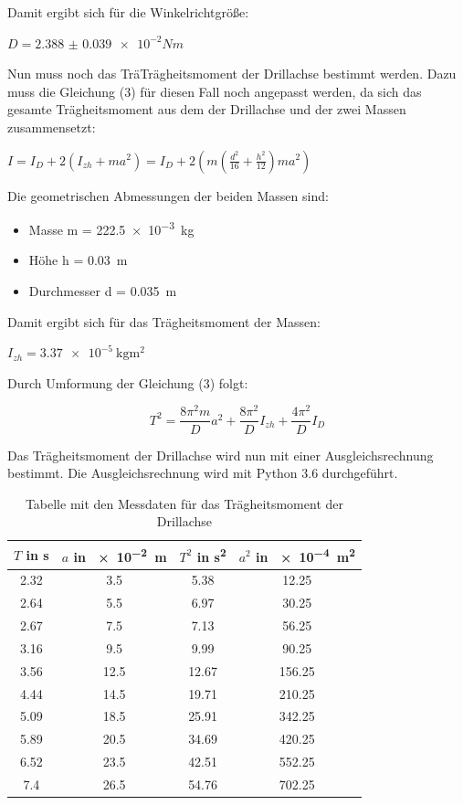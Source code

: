 Damit ergibt sich für die Winkelrichtgröße:

\centerline{$D = \num{2.388(39)e-2} Nm$}

Nun muss noch das TräTrägheitsmoment der Drillachse bestimmt werden. Dazu muss
die Gleichung (3) für diesen Fall noch angepasst werden, da sich das gesamte
Trägheitsmoment aus dem der Drillachse und der zwei Massen zusammensetzt:

$I = I_D + 2(I_{zh} + ma^2) = I_D + 2(m \left( \frac{d^2}{16} + \frac{h^2}{12} \right)
ma^2)$

Die geometrischen Abmessungen der beiden Massen sind:

\begin{itemize}
  \item Masse m = \SI{222.5e-3}{\kilo\gram}
  \item Höhe h = \SI{0.03}{\meter}
  \item Durchmesser d = \SI{0.035}{\meter}
\end{itemize}

Damit ergibt sich für das Trägheitsmoment der Massen:

\centerline{$I_{zh} = \SI{3.37e-5}{\kilo\gram\meter\squared}$}

Durch Umformung der Gleichung (3) folgt:

\begin{equation}
  T^2 = \frac{8\pi^2m}{D} a^2 + \frac{8\pi^2}{D} I_{zh} + \frac{4\pi^2}{D} I_D
\end{equation}


Das Trägheitsmoment der Drillachse wird nun mit einer Ausgleichsrechnung bestimmt.
Die Ausgleichsrechnung wird mit Python 3.6 durchgeführt.

\begin{table}
  \centering
  \caption{Tabelle mit den Messdaten für das Trägheitsmoment der Drillachse}
  \begin{tabular}{c c c c}
    \toprule
    $T$ in \si{\second} & $a$ in \SI{e-2}{\meter} & $T^2$ in \si{\second\squared} &
    $a^2$ in \SI{e-4}{\meter\squared} \\
    \midrule
    2.32 & 3.5  & 5.38  & 12.25 \\
    2.64 & 5.5  & 6.97  & 30.25 \\
    2.67 & 7.5  & 7.13  & 56.25 \\
    3.16 & 9.5  & 9.99  & 90.25 \\
    3.56 & 12.5 & 12.67 & 156.25 \\
    4.44 & 14.5 & 19.71 & 210.25 \\
    5.09 & 18.5 & 25.91 & 342.25 \\
    5.89 & 20.5 & 34.69 & 420.25 \\
    6.52 & 23.5 & 42.51 & 552.25 \\
    7.4  & 26.5 & 54.76 &  702.25 \\
    \bottomrule
  \end{tabular}
\end{table}

